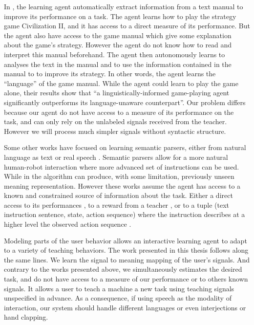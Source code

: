 In \cite{branavan2011learning}, the learning agent automatically extract information from a text manual to improve its performance on a task. The agent learns how to play the strategy game Civilization II, and it has access to a direct measure of its performance. But the agent also have access to the game manual which give some explanation about the game's strategy. However the agent do not know how to read and interpret this manual beforehand. The agent then autonomously learns to analyses the text in the manual and to use the information contained in the manual to to improve its strategy. In other words, the agent learns the ``language'' of the game manual. While the agent could learn to play the game alone, their results show that ``a linguistically-informed game-playing agent significantly outperforms its language-unaware counterpart''. Our problem differs because our agent do not have access to a measure of its performance on the task, and can only rely on the unlabeled signals received from the teacher. However we will process much simpler signals without syntactic structure.

Some other works have focused on learning semantic parsers, either from natural language as text \cite{branavan2011learning,kim2012unsupervised} or real speech \cite{doshi2008spoken}. Semantic parsers allow for a more natural human-robot interaction where more advanced set of instructions can be used. While in \cite{kim2012unsupervised} the algorithm can produce, with some limitation, previously unseen meaning representation. However these works assume the agent has access to a known and constrained source of information about the task. Either a direct access to its performances \cite{branavan2011learning}, to a reward from a teacher \cite{doshi2008spoken}, or to a tuple (text instruction sentence, state, action sequence) where the instruction describes at a higher level the observed action sequence \cite{kim2012unsupervised}.

\transition


Modeling parts of the user behavior allows an interactive learning agent to adapt to a variety of teaching behaviors. The work presented in this thesis follows along the same lines. We learn the signal to meaning mapping of the user's signals. And contrary to the works presented above, we simultaneously estimates the desired task, and do not have access to a measure of our performance or to others known signals. It allows a user to teach a machine a new task using teaching signals unspecified in advance. As a consequence, if using speech as the modality of interaction, our system should handle different languages or even interjections or hand clapping.

